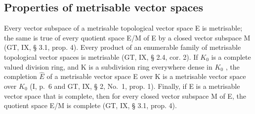 \subsection{Properties of metrisable vector spaces}

Every vector subspace of a metrisable topological vector space E is metrisable; the same is true of every quotient space E/M of E by a closed vector subspace M (GT, IX, § 3.1, prop. 4). Every product of an enumerable family of metrisable topological vector spaces is metrisable (GT, IX, § 2.4, cor. 2). If \(K_{0}\) is a complete valued division ring, and K is a subdivision ring everywhere dense in \(K_{0}\) , the completion \(\hat{E}\) of a metrisable vector space E over K is a metrisable vector space over \(K_{0}\) (I, p.~6 and GT, IX, § 2, No.~1, prop. 1). Finally, if E is a metrisable vector space that is complete, then for every closed vector subspace M of E, the quotient space E/M is complete (GT, IX, § 3.1, prop. 4).

